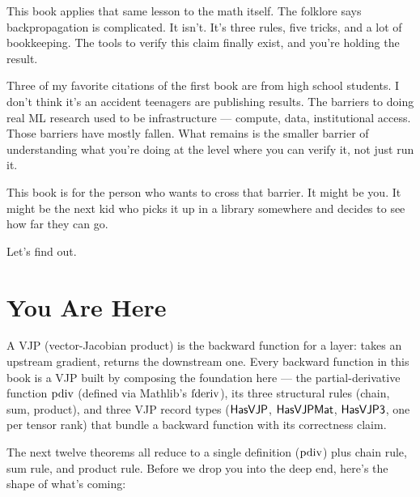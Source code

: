 This book applies that same lesson to the math itself. The folklore
says backpropagation is complicated. It isn't. It's three rules, five
tricks, and a lot of bookkeeping. The tools to verify this claim
finally exist, and you're holding the result.

Three of my favorite citations of the first book are from high school
students. I don't think it's an accident teenagers are publishing
results. The barriers to doing real
ML research used to be infrastructure --- compute, data, institutional
access. Those barriers have mostly fallen. What remains is the
smaller barrier of understanding what you're doing at the level where
you can verify it, not just run it.

This book is for the person who wants to cross that barrier. It might
be you. It might be the next kid who picks it up in a library somewhere
and decides to see how far they can go.

Let's find out.

\chapter{You Are Here}
\label{chap:tensor}

A VJP (vector-Jacobian product) is the backward function for a layer:
takes an upstream gradient, returns the downstream one. Every backward
function in this book is a VJP built by composing the foundation
here --- the partial-derivative function \(\operatorname{pdiv}\) (defined via
Mathlib's \(\operatorname{fderiv}\)), its three structural rules (chain, sum,
product), and three VJP record types (\(\mathsf{HasVJP}\),
\(\mathsf{HasVJPMat}\), \(\mathsf{HasVJP3}\), one per tensor rank) that bundle a
backward function with its correctness claim.

The next twelve theorems all reduce to a single definition
(\(\operatorname{pdiv}\)) plus chain rule, sum rule, and product rule. Before
we drop you into the deep end, here's the shape of what's coming:

